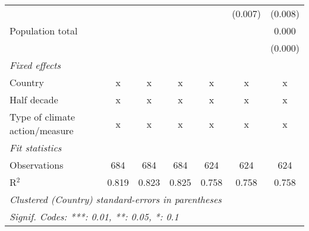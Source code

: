\begin{tabular}{lcccccc}
                                                &               &               &               &               & (0.007)       & (0.008)\\   
   Population total                             &               &               &               &               &               & 0.000\\   
                                                &               &               &               &               &               & (0.000)\\   
   \emph{Fixed effects}\\
   Country                                      & x             & x             & x             & x             & x             & x\\  
   Half decade                                  & x             & x             & x             & x             & x             & x\\  
   Type of climate action/measure               & x             & x             & x             & x             & x             & x\\  
   \midrule \emph{Fit statistics}\\
   Observations                                 & 684           & 684           & 684           & 624           & 624           & 624\\  
   R$^2$                                        & 0.819         & 0.823         & 0.825         & 0.758         & 0.758         & 0.758\\  
   \midrule
   \multicolumn{7}{l}{\emph{Clustered (Country) standard-errors in parentheses}}\\
   \multicolumn{7}{l}{\emph{Signif. Codes: ***: 0.01, **: 0.05, *: 0.1}}\\
\end{tabular}
\par\endgroup


